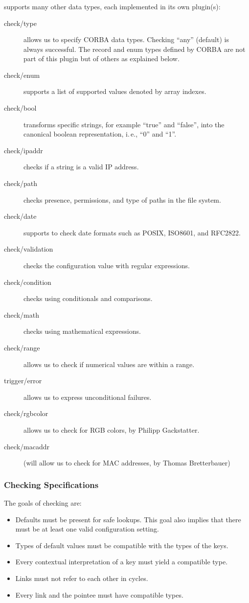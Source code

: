 \begin{frame}[allowframebreaks]
	\frametitle{}
	\elektra{} supports many other data types, each implemented in its own plugin(s):
	\begin{description}
	\item [check/type] allows us to specify CORBA data types.
	Checking ``any'' (default) is always successful.
	The record and enum types defined by CORBA are not part of this plugin but of others as explained below.

	\item [check/enum] supports a list of supported values denoted by array indexes.
	\item [check/bool] transforms specific strings, for example ``true'' and ``false'', into the canonical boolean representation, i.\,e., ``0'' and ``1''.
	\item [check/ipaddr] checks if a string is a valid IP address.
	\item [check/path] checks presence, permissions, and type of paths in the file system.
	\item [check/date] supports to check date formats such as POSIX, ISO8601, and RFC2822.
	\item [check/validation] checks the configuration value with regular expressions.
	\item [check/condition] checks using conditionals and comparisons.
	\item [check/math] checks using mathematical expressions.
	\item [check/range] allows us to check if numerical values are within a range.
	\item [trigger/error] allows us to express unconditional failures.
	\item [check/rgbcolor] allows us to check for RGB colors, by Philipp Gackstatter.
	\item [check/macaddr]  (will allow us to check for MAC addresses, by Thomas Bretterbauer)
	\end{description}
\end{frame}

\begin{frame}
	\frametitle{Checking Specifications}

	The goals of checking  are:

	\begin{itemize}[<+-| alert@+>]
	\item Defaults must be present for safe lookups.
	This goal also implies that there must be at least one valid configuration setting.
	\item Types of default values must be compatible with the types of the keys.
	\item Every contextual interpretation of a key must yield a compatible type.
	\item Links must not refer to each other in cycles.
	\item Every link and the pointee must have compatible types.
	\end{itemize}
\end{frame}

